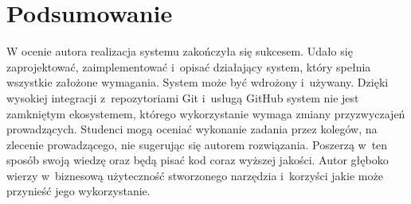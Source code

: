 \chapter{Podsumowanie}

W ocenie autora realizacja systemu zakończyła się sukcesem. Udało się zaprojektować, zaimplementować i~opisać działający system, który spełnia wszystkie założone wymagania. System może być wdrożony i~używany. Dzięki wysokiej integracji z~repozytoriami Git i~usługą GitHub system nie jest zamkniętym ekosystemem, którego wykorzystanie wymaga zmiany przyzwyczajeń prowadzących. Studenci mogą oceniać wykonanie zadania przez kolegów, na zlecenie prowadzącego, nie sugerując się autorem rozwiązania. Poszerzą w~ten sposób swoją wiedzę oraz będą pisać kod coraz wyższej jakości. Autor głęboko wierzy w~biznesową użyteczność stworzonego narzędzia i~korzyści jakie może przynieść jego wykorzystanie.